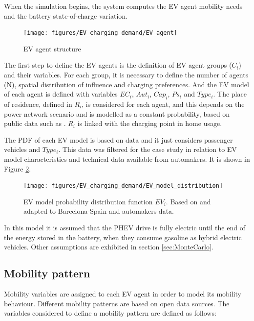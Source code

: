 \documentclass[a4paper,11pt,twoside,openright]{report}
\begin{document}
When the simulation begins, the system computes the EV agent mobility needs and the battery state-of-charge variation.

\begin{figure}[h!]
	\centering
	\texttt{[image: figures/EV\_charging\_demand/EV\_agent]}
	\caption{EV agent structure}
	\label{fig:EV_agent_structure}
\end{figure}

The first step to define the EV agents is the definition of EV agent groups ($C_{i}$) and their variables. For each group, it is necessary to define the number of agents (N), spatial distribution of influence and charging preferences.
And the EV model of each agent is defined with variables $EC_{i}$, $Aut_{i}$, $Cap_{i}$, $Ps_{i}$ and $Type_{i}$. The place of residence, defined in $R_{i}$, is considered for each agent, and this depends on the power network scenario and is modelled as a constant probability, based on public data such as \cite{Estad_BCN}. $R_{i}$ is linked with the charging point in home usage.

The PDF of each EV model is based on \cite{EV_Forecast_FandS} data and it just considers passenger vehicles and $Type_{i}$. This data was filtered for the case study in relation to EV model characteristics and technical data available from automakers. It is shown in Figure \ref{fig:EV_distrib}.

\begin{figure}[h!]
	\centering
	\texttt{[image: figures/EV\_charging\_demand/EV\_model\_distribution]}
	\caption{EV model probability distribution function $EV_{i}$. Based on \cite{EV_Forecast_FandS} and adapted to Barcelona-Spain and automakers data.}
	\label{fig:EV_distrib}
\end{figure}

In this model it is assumed that the PHEV drive is fully electric until the end of the energy stored in the battery, when they consume gasoline as hybrid electric vehicles. Other assumptions are exhibited in section \ref{sec:MonteCarlo}. 

\subsection{Mobility pattern} \label{sec:Mob_pattern}

Mobility variables are assigned to each EV agent in order to model its mobility behaviour. Different mobility patterns are based on open data sources. The variables considered to define a mobility pattern are defined as follows:
\end{document}

